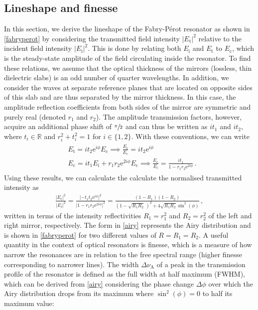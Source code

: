 \documentclass[../Thesis-IJspeert.tex]{subfiles}
\begin{document}
\subsection{Lineshape and finesse}
In this section, we derive the lineshape of the Fabry-Pérot resonator as shown in \autoref{fabryperot} by considering the transmitted field intensity ${\lvert E_\mathrm{t}\rvert^2}$ relative to the incident field intensity ${\lvert E_\mathrm{i}\rvert^2}$. This is done by relating both $ E_\mathrm{i}$ and $ E_\mathrm{t}$ to $ E_\mathrm{c}$, which is the steady-state amplitude of the field circulating inside the resonator. To find these relations, we assume that the optical thickness of the mirrors (lossless, thin dielectric slabs) is an odd number of quarter wavelengths. In addition, we consider the waves at separate reference planes that are located on opposite sides of this slab and are thus separated by the mirror thickness. In this case, the amplitude reflection coefficients from both sides of the mirror are symmetric and purely real (denoted $r_1$ and $r_2$). The amplitude transmission factors, however, acquire an additional phase shift of $\sfrac{\pi}{2}$ and can thus be written as $it_1$ and $it_2$, where $t_i\in \mathbb{R}$ and $r_i^2+t_i^2=1$ for $i\in \{ 1,2\}$. With these conventions, we can write
\begin{align}
\begin{split}
&E_\mathrm{t}= it_2 \mathrm{e}^{i\phi} E_\mathrm{c} \implies \frac{E_\mathrm{t}}{E_\mathrm{c}} = it_2 \mathrm{e}^{i\phi}\\
&E_\mathrm{c}= it_1 E_\mathrm{i} + r_1 r_2 \mathrm{e}^{2i\phi} E_\mathrm{c} \implies \frac{E_\mathrm{c}}{E_\mathrm{i}} = \frac{it_1}{1-r_1 r_2 \mathrm{e}^{2i\phi}} \,.
\end{split}
\end{align}
Using these results, we can calculate the calculate the normalised transmitted intensity as
\begin{align}
\label{airy}
\frac{\lvert E_\mathrm{t}\rvert^2}{\lvert E_\mathrm{i}\rvert^2} = \frac{\lvert -t_1 t_2 \mathrm{e}^{i\phi}\rvert^2}{\lvert 1-r_1 r_2\mathrm{e}^{2i\phi}\rvert^2}=\frac{(1-R_1)(1-R_2)}{\left(1-\sqrt{R_1R_2}\,\right)^2 + 4\sqrt{R_1R_2}\sin^2(\phi)}\,,
\end{align}
written in terms of the intensity reflectivities $R_1=r_1^2$ and $R_2=r_2^2$ of the left and right mirror, respectively. The form in \autoref{airy} represents the Airy distribution and is shown in \autoref{fabryperot} for two different values of $R=R_1=R_2$. A useful quantity in the context of optical resonators is finesse, which is a measure of how narrow the resonances are in relation to the free spectral range (higher finesse corresponding to narrower lines). The width $\Delta \nu_\mathrm{A}$ of a peak in the transmission profile of the resonator is defined as the full width at half maximum (FWHM), which can be derived from \autoref{airy} considering the phase change $\Delta \phi$ over which the Airy distribution drops from its maximum where $\sin^2(\phi)=0$ to half its maximum value:
\end{document}
